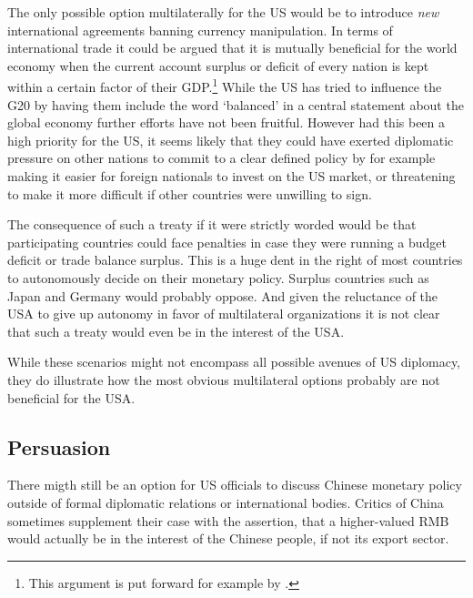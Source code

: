 The only possible option multilaterally for the US would be to introduce \emph{new} international agreements banning currency manipulation. In terms of international trade it could be argued that it is mutually 
beneficial for the world economy when the current account surplus or 
deficit of every nation is kept within a certain factor of their 
GDP.\footnote{This argument is put forward for example by
\cite{cline2009}.} While the US has tried to influence the G20 by having 
them include the word `balanced' in a central statement about the global 
economy further efforts have not been fruitful. However had this been a 
high priority for the US, it seems likely that they could have exerted 
diplomatic pressure on other nations to commit to a clear defined policy 
by for example making it easier for foreign nationals to invest on the 
US market, or threatening to make it more difficult if other countries 
were unwilling to sign.

The consequence of such a treaty if it were strictly worded would be 
that participating countries could face penalties in case they were 
running a budget deficit or trade balance surplus.  This is a huge dent 
in the right of most countries to autonomously decide on their monetary 
policy. Surplus countries such as Japan and Germany would probably oppose. And given the reluctance of the USA to give up autonomy in favor of multilateral organizations it is not clear that such a treaty 
would even be in the interest of the USA.

While these scenarios might not encompass all possible avenues of US diplomacy, they do illustrate how the most obvious 
multilateral options probably are not beneficial for the USA.


\subsection{Persuasion}

There migth still be an option for US officials to discuss Chinese monetary policy outside of formal diplomatic relations or international bodies. Critics of China sometimes supplement their case with the assertion, 
that a higher-valued RMB would actually be in the interest of the 
Chinese people, if not its export sector.

